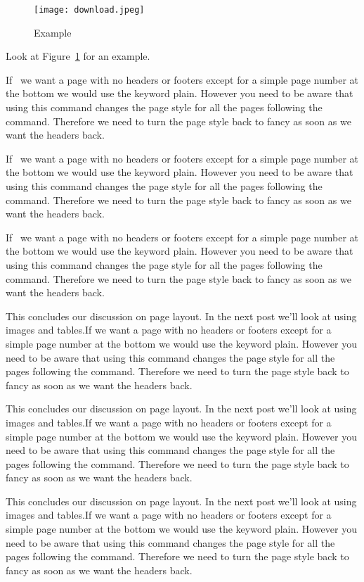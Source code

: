 \begin{figure}[h]
    \centering
    \texttt{[image: download.jpeg]}
    \caption{Example}
    \label{fig:results}
\end{figure}

Look at Figure~\ref{fig:results} for an example.

If~\cite{caselloTransportationActivityCenters2006} we want a page with no headers or footers except for a simple page number at the bottom we would use the keyword plain. However you need to be aware that using this command changes the page style for all the pages following the command. Therefore we need to turn the page style back to fancy as soon as we want the headers back.

If~\citep{caselloTransportationActivityCenters2006} we want a page with no headers or footers except for a simple page number at the bottom we would use the keyword plain. However you need to be aware that using this command changes the page style for all the pages following the command. Therefore we need to turn the page style back to fancy as soon as we want the headers back.

If~\citet{caselloTransportationActivityCenters2006} we want a page with no headers or footers except for a simple page number at the bottom we would use the keyword plain. However you need to be aware that using this command changes the page style for all the pages following the command. Therefore we need to turn the page style back to fancy as soon as we want the headers back.

This concludes our discussion on page layout. In the next post we'll look at using images and tables.If we want a page with no headers or footers except for a simple page number at the bottom we would use the keyword plain. However you need to be aware that using this command changes the page style for all the pages following the command. Therefore we need to turn the page style back to fancy as soon as we want the headers back.

This concludes our discussion on page layout. In the next post we'll look at using images and tables.If we want a page with no headers or footers except for a simple page number at the bottom we would use the keyword plain. However you need to be aware that using this command changes the page style for all the pages following the command. Therefore we need to turn the page style back to fancy as soon as we want the headers back.

This concludes our discussion on page layout. In the next post we'll look at using images and tables.If we want a page with no headers or footers except for a simple page number at the bottom we would use the keyword plain. However you need to be aware that using this command changes the page style for all the pages following the command. Therefore we need to turn the page style back to fancy as soon as we want the headers back.

